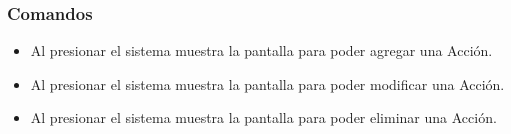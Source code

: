 \subsubsection{Comandos}
\begin{itemize}
 \item Al presionar  el sistema muestra la pantalla  para poder agregar una Acción.
 \item Al presionar  el sistema muestra la pantalla  para poder modificar una Acción.
 \item Al presionar  el sistema muestra la pantalla  para poder eliminar una Acción.
\end{itemize}

